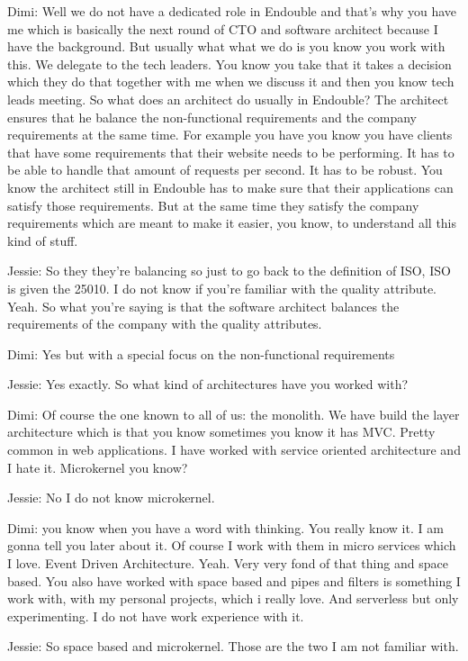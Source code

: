 Dimi: Well we do not have a dedicated role in Endouble and that's why you have me which is basically the next round of CTO and software architect because I have the background. But usually what what we do is you know you work with this. We delegate to the tech leaders. You know you take that it takes a decision which they do that together with me when we discuss it and then you know tech leads meeting. So what does an architect do usually in Endouble? The architect ensures that he balance the non-functional requirements and the company requirements at the same time. For example you have you know you have clients that have some requirements that their website needs to be performing. It has to be able to handle that amount of requests per second. It has to be robust. You know the architect still in Endouble has to make sure that their applications can satisfy those requirements. But at the same time they satisfy the company requirements which are meant to make it easier, you know, to understand all this kind of stuff.

Jessie: So they they're balancing so just to go back to the definition of ISO, ISO is given the 25010. I do not know if you're familiar with the quality attribute. Yeah. So what you're saying is that the software architect balances the requirements of the company with the quality attributes.

Dimi: Yes but with a special focus on the non-functional requirements

Jessie: Yes exactly. So what kind of architectures have you worked with?

Dimi: Of course the one known to all of us: the monolith. We have build the layer architecture which is that you know sometimes you know it has MVC. Pretty common in web applications. I have worked with service oriented architecture and I hate it. Microkernel you know?

Jessie: No I do not know microkernel.

Dimi: you know when you have a word with thinking. You really know it. I am gonna tell you later about it. Of course I work with them in micro services which I love. Event Driven Architecture. Yeah. Very very fond of that thing and space based. You also have worked with space based and pipes and filters is something I work with, with my personal projects, which i really love. And serverless but only experimenting. I do not have work experience with it.

Jessie: So space based and microkernel. Those are the two I am not familiar with.

